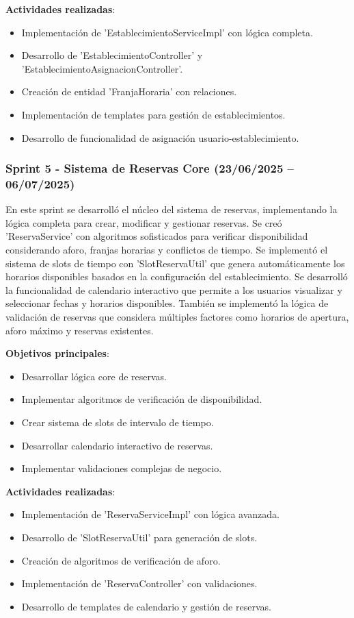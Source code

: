 \textbf{Actividades realizadas}:
\begin{itemize}
\tightlist
\item
Implementación de 'EstablecimientoServiceImpl' con lógica completa.
\item
Desarrollo de 'EstablecimientoController' y 'EstablecimientoAsignacionController'.
\item
Creación de entidad 'FranjaHoraria' con relaciones.
\item
Implementación de templates para gestión de establecimientos.
\item
Desarrollo de funcionalidad de asignación usuario-establecimiento.
\end{itemize}

\subsubsection{Sprint 5 - Sistema de Reservas Core (23/06/2025 – 06/07/2025)} 
En este sprint se desarrolló el núcleo del sistema de reservas, implementando la lógica completa para crear, modificar y gestionar reservas. Se creó 'ReservaService' con algoritmos sofisticados para verificar disponibilidad considerando aforo, franjas horarias y conflictos de tiempo. Se implementó el sistema de slots de tiempo con 'SlotReservaUtil' que genera automáticamente los horarios disponibles basados en la configuración del establecimiento. Se desarrolló la funcionalidad de calendario interactivo que permite a los usuarios visualizar y seleccionar fechas y horarios disponibles. También se implementó la lógica de validación de reservas que considera múltiples factores como horarios de apertura, aforo máximo y reservas existentes.

\textbf{Objetivos principales}:
\begin{itemize}
\tightlist
\item
Desarrollar lógica core de reservas.
\item
Implementar algoritmos de verificación de disponibilidad.
\item
Crear sistema de slots de intervalo de tiempo.
\item
Desarrollar calendario interactivo de reservas.
\item
Implementar validaciones complejas de negocio.
\end{itemize}

\textbf{Actividades realizadas}:
\begin{itemize}
\tightlist
\item
Implementación de 'ReservaServiceImpl' con lógica avanzada.
\item
Desarrollo de 'SlotReservaUtil' para generación de slots.
\item
Creación de algoritmos de verificación de aforo.
\item
Implementación de 'ReservaController' con validaciones.
\item
Desarrollo de templates de calendario y gestión de reservas.
\end{itemize}

